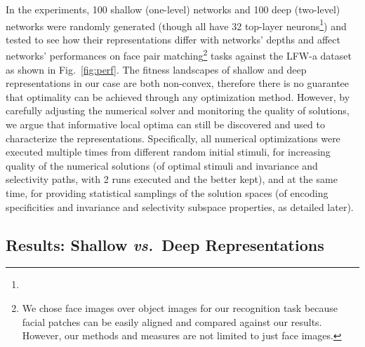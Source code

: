 \documentclass[10pt,twocolumn,letterpaper]{article}
\begin{document}
\newcommand{\exptask}{We chose face images over object images for our recognition task because facial patches can be easily aligned and compared against our results. However, our methods and measures are not limited to just face images.}

In the experiments, 100 shallow (\ie one-level) networks and 100 deep (\ie two-level) networks {were} randomly generated (though all have 32 top-layer neurons\footnote{\expsettings}) and tested to see how their representations differ with networks' depths and affect networks' performances on face pair matching\footnote{\exptask} tasks against the LFW-a dataset \cite{LFWTech, wolf2011effective} as shown in Fig.~\ref{fig:perf}. %
The fitness landscapes of shallow and deep representations in our case are both non-convex, therefore there is no guarantee that optimality can be achieved through any optimization method.
However, by carefully adjusting the numerical solver and monitoring the quality of solutions, we argue that informative local optima can still be discovered and used to characterize the representations.
Specifically, all numerical optimizations {were} executed multiple times from different random initial stimuli, for increasing quality of the numerical solutions (of optimal stimuli and invariance and selectivity paths, with 2 runs executed and the better kept), and at the same time, for providing statistical samplings of the solution spaces (of encoding specificities and invariance and selectivity subspace properties, as detailed later).


\subsection{Results: Shallow \textbf{\textit{vs.}}~Deep Representations}
\end{document}
